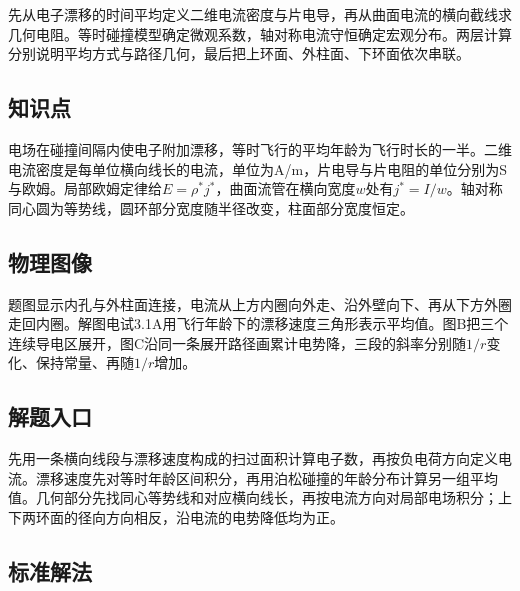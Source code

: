 \documentclass[UTF8,fontset=fandol,a4paper,11pt]{ctexart}
\begin{document}
先从电子漂移的时间平均定义二维电流密度与片电导，再从曲面电流的横向截线求几何电阻。等时碰撞模型确定微观系数，轴对称电流守恒确定宏观分布。两层计算分别说明平均方式与路径几何，最后把上环面、外柱面、下环面依次串联。



\subsection*{知识点}

电场在碰撞间隔内使电子附加漂移，等时飞行的平均年龄为飞行时长的一半。二维电流密度是每单位横向线长的电流，单位为A/m，片电导与片电阻的单位分别为S与欧姆。局部欧姆定律给$E=\rho^*j^*$，曲面流管在横向宽度$w$处有$j^*=I/w$。轴对称同心圆为等势线，圆环部分宽度随半径改变，柱面部分宽度恒定。



\subsection*{物理图像}

题图显示内孔与外柱面连接，电流从上方内圈向外走、沿外壁向下、再从下方外圈走回内圈。解图电试3.1A用飞行年龄下的漂移速度三角形表示平均值。图B把三个连续导电区展开，图C沿同一条展开路径画累计电势降，三段的斜率分别随$1/r$变化、保持常量、再随$1/r$增加。



\subsection*{解题入口}

先用一条横向线段与漂移速度构成的扫过面积计算电子数，再按负电荷方向定义电流。漂移速度先对等时年龄区间积分，再用泊松碰撞的年龄分布计算另一组平均值。几何部分先找同心等势线和对应横向线长，再按电流方向对局部电场积分；上下两环面的径向方向相反，沿电流的电势降低均为正。



\subsection*{标准解法}
\end{document}

